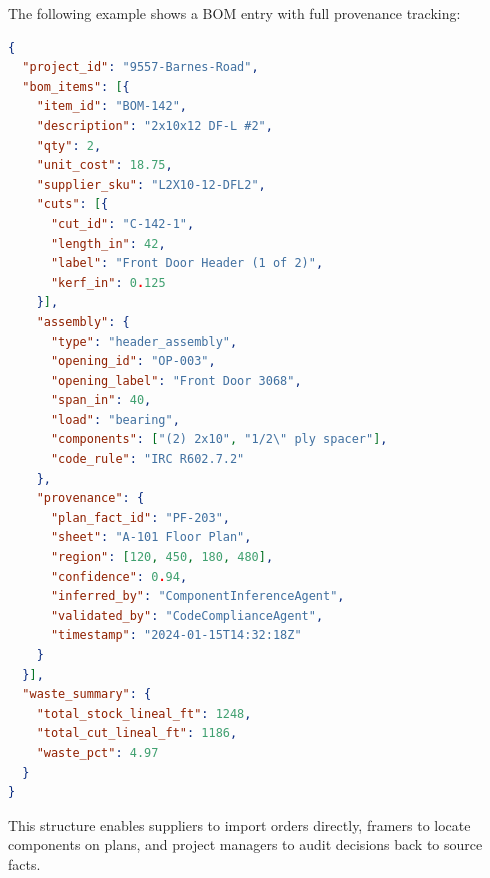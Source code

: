 The following example shows a BOM entry with full provenance tracking:

\begin{lstlisting}[language=json, basicstyle=\ttfamily\scriptsize]
{
  "project_id": "9557-Barnes-Road",
  "bom_items": [{
    "item_id": "BOM-142",
    "description": "2x10x12 DF-L #2",
    "qty": 2,
    "unit_cost": 18.75,
    "supplier_sku": "L2X10-12-DFL2",
    "cuts": [{
      "cut_id": "C-142-1",
      "length_in": 42,
      "label": "Front Door Header (1 of 2)",
      "kerf_in": 0.125
    }],
    "assembly": {
      "type": "header_assembly",
      "opening_id": "OP-003",
      "opening_label": "Front Door 3068",
      "span_in": 40,
      "load": "bearing",
      "components": ["(2) 2x10", "1/2\" ply spacer"],
      "code_rule": "IRC R602.7.2"
    },
    "provenance": {
      "plan_fact_id": "PF-203",
      "sheet": "A-101 Floor Plan",
      "region": [120, 450, 180, 480],
      "confidence": 0.94,
      "inferred_by": "ComponentInferenceAgent",
      "validated_by": "CodeComplianceAgent",
      "timestamp": "2024-01-15T14:32:18Z"
    }
  }],
  "waste_summary": {
    "total_stock_lineal_ft": 1248,
    "total_cut_lineal_ft": 1186,
    "waste_pct": 4.97
  }
}
\end{lstlisting}

This structure enables suppliers to import orders directly, framers to locate components on plans, and project managers to audit decisions back to source facts.
